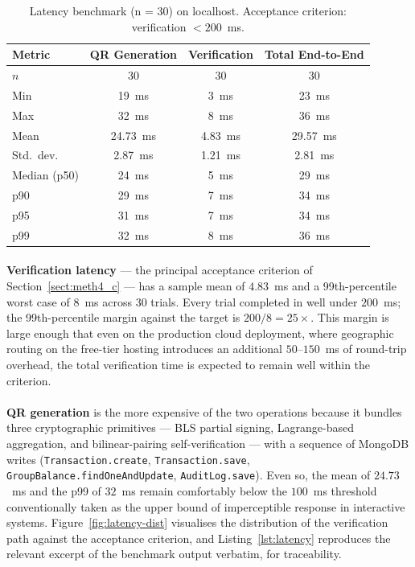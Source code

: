 \begin{table}[H]
  \centering
  \caption{Latency benchmark (n = 30) on localhost. Acceptance criterion: verification $< 200$~ms.}
  \label{tab:latency}
  \begin{tabular}{|l|c|c|c|}
    \hline
    Metric & QR Generation & Verification & Total End-to-End \\\hline
    $n$ & 30 & 30 & 30 \\\hline
    Min & 19~ms & 3~ms & 23~ms \\\hline
    Max & 32~ms & 8~ms & 36~ms \\\hline
    Mean & 24.73~ms & 4.83~ms & 29.57~ms \\\hline
    Std.\ dev. & 2.87~ms & 1.21~ms & 2.81~ms \\\hline
    Median (p50) & 24~ms & 5~ms & 29~ms \\\hline
    p90 & 29~ms & 7~ms & 34~ms \\\hline
    p95 & 31~ms & 7~ms & 34~ms \\\hline
    p99 & 32~ms & 8~ms & 36~ms \\\hline
  \end{tabular}
\end{table}

\paragraph{}\textbf{Verification latency} --- the principal acceptance criterion of Section~\ref{sect:meth4_c} --- has a sample mean of $4.83$~ms and a 99th-percentile worst case of $8$~ms across 30 trials. Every trial completed in well under $200$~ms; the 99th-percentile margin against the target is $200 / 8 = 25\times$. This margin is large enough that even on the production cloud deployment, where geographic routing on the free-tier hosting introduces an additional $50$--$150$~ms of round-trip overhead, the total verification time is expected to remain well within the criterion.

\paragraph{}\textbf{QR generation} is the more expensive of the two operations because it bundles three cryptographic primitives --- BLS partial signing, Lagrange-based aggregation, and bilinear-pairing self-verification --- with a sequence of MongoDB writes (\texttt{Transaction.create}, \texttt{Transaction.save}, \texttt{GroupBalance.findOneAndUpdate}, \texttt{AuditLog.save}). Even so, the mean of $24.73$~ms and the p99 of $32$~ms remain comfortably below the $100$~ms threshold conventionally taken as the upper bound of imperceptible response in interactive systems. Figure~\ref{fig:latency-dist} visualises the distribution of the verification path against the acceptance criterion, and Listing~\ref{lst:latency} reproduces the relevant excerpt of the benchmark output verbatim, for traceability.

